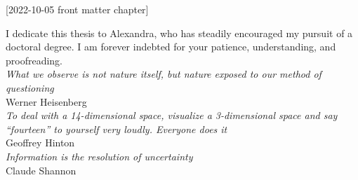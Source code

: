 [2022-10-05 front matter chapter]
%
%
%
%
%
%

%
%
%
\begin{statement}
\end{statement}

\begin{dedication}
I dedicate this thesis to Alexandra, who has steadily encouraged my pursuit of a doctoral degree. I am forever indebted for your patience, understanding, and proofreading.\\
\vspace{2in}
\textit{What we observe is not nature itself, but nature exposed to our method of questioning} \\Werner Heisenberg \\
\vspace{1in}
\textit{To deal with a 14-dimensional space, visualize a 3-dimensional space and say ``fourteen'' to yourself very loudly. Everyone does it}\\ Geoffrey Hinton \\
\vspace{1in}
\textit{Information is the resolution of uncertainty} \\Claude Shannon
\vspace{1in}

\end{dedication}

